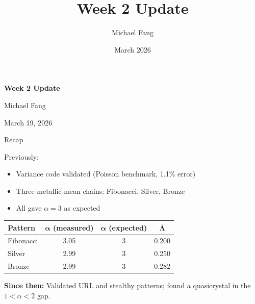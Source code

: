 \documentclass[aspectratio=169, 11pt]{beamer}
\title{Week 2 Update}
\author{Michael Fang}
\date{March 2026}
\begin{document}
\begin{frame}
\centering
\vspace{2em}
{\Large\textbf{Week 2 Update}}

\vspace{1em}
Michael Fang

\vspace{0.5em}
March 19, 2026
\end{frame}

\begin{frame}{Recap}

Previously:
\begin{itemize}
    \item Variance code validated (Poisson benchmark, 1.1\% error)
    \item Three metallic-mean chains: Fibonacci, Silver, Bronze
    \item All gave $\alpha = 3$ as expected
\end{itemize}

\vspace{0.5em}
\begin{table}
\centering
\begin{tabular}{lccc}
\toprule
\textbf{Pattern} & $\boldsymbol{\alpha}$ (measured) & $\boldsymbol{\alpha}$ (expected) & $\boldsymbol{\bar{\Lambda}}$ \\
\midrule
Fibonacci & 3.05 & 3 & 0.200 \\
Silver & 2.99 & 3 & 0.250 \\
Bronze & 2.99 & 3 & 0.282 \\
\bottomrule
\end{tabular}
\end{table}

\vspace{0.5em}
\textbf{Since then:} Validated URL and stealthy patterns; found a quasicrystal in the $1 < \alpha < 2$ gap.
\end{frame}
\end{document}
